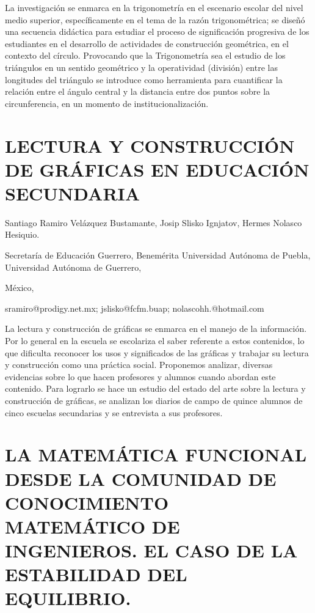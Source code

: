 La investigación se enmarca en la trigonometría en el escenario escolar
del nivel medio superior, específicamente en el tema de la razón trigonométrica;
se diseñó una secuencia didáctica para estudiar el proceso de significación
progresiva de los estudiantes en el desarrollo de actividades de construcción
geométrica, en el contexto del círculo. Provocando que la Trigonometría
sea el estudio de los triángulos en un sentido geométrico y la operatividad
(división) entre las longitudes del triángulo se introduce como herramienta
para cuantificar la relación entre el ángulo central y la distancia
entre dos puntos sobre la circunferencia, en un momento de institucionalización.


\section{LECTURA Y CONSTRUCCIÓN DE GRÁFICAS EN EDUCACIÓN SECUNDARIA}

\begin{datos}

Santiago Ramiro Velázquez Bustamante, Josip Slisko Ignjatov, Hermes
Nolasco Hesiquio.

Secretaría de Educación Guerrero, Benemérita Universidad Autónoma
de Puebla, Universidad Autónoma de Guerrero,

México,

sramiro@prodigy.net.mx; jslisko@fcfm.buap; nolascohh.@hotmail.com

\end{datos}

La lectura y construcción de gráficas se enmarca en el manejo de la
información. Por lo general en la escuela se escolariza el saber referente
a estos contenidos, lo que dificulta reconocer los usos y significados
de las gráficas y trabajar su lectura y construcción como una práctica
social. Proponemos analizar, diversas evidencias sobre lo que hacen
profesores y alumnos cuando abordan este contenido. Para lograrlo
se hace un estudio del estado del arte sobre la lectura y construcción
de gráficas, se analizan los diarios de campo de quince alumnos de
cinco escuelas secundarias y se entrevista a sus profesores.


\section{LA MATEMÁTICA FUNCIONAL DESDE LA COMUNIDAD DE CONOCIMIENTO MATEMÁTICO
DE INGENIEROS. EL CASO DE LA ESTABILIDAD DEL EQUILIBRIO. }

